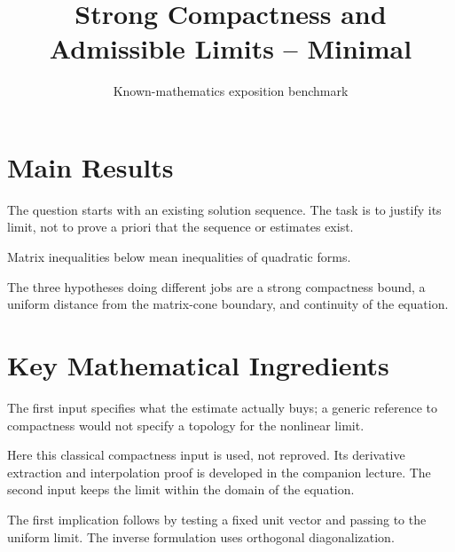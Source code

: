 \documentclass[12pt,reqno]{amsart}
\title{Strong Compactness and Admissible Limits -- Minimal}
\author{Known-mathematics exposition benchmark}
\date{}
\begin{document}
\maketitle
\section{Main Results}
The question starts with an existing solution sequence. The task is to
justify its limit, not to prove a priori that the sequence or estimates exist.



Matrix inequalities below mean inequalities of quadratic forms.
\begin{theorem}\label{thm:main}

\end{theorem}
The three hypotheses doing different jobs are a strong compactness bound,
a uniform distance from the matrix-cone boundary, and continuity of the equation.

\section{Key Mathematical Ingredients}
The first input specifies what the estimate actually buys; a generic
reference to compactness would not specify a topology for the nonlinear limit.
\begin{samepage}
\begin{lemma}\label{lem:compactness}

\end{lemma}
\end{samepage}
Here this classical compactness input is used, not reproved. Its derivative
extraction and interpolation proof is developed in the companion lecture.
The second input keeps the limit within the domain of the equation.
\begin{lemma}\label{lem:margin}

\end{lemma}
The first implication follows by testing a fixed unit vector and passing
to the uniform limit. The inverse formulation uses orthogonal diagonalization.
\end{document}
